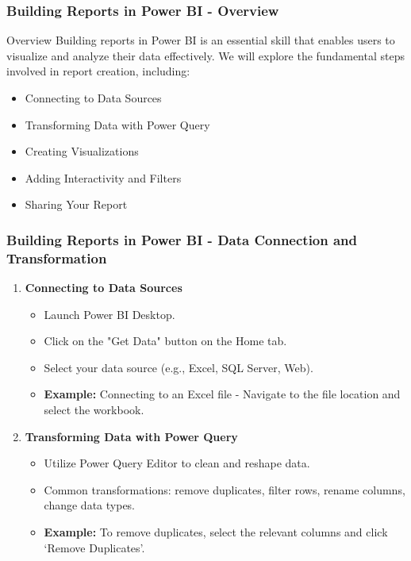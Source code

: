 \documentclass[aspectratio=169]{beamer}
\begin{document}
\begin{frame}[fragile]
    \frametitle{Building Reports in Power BI - Overview}
    \begin{block}{Overview}
        Building reports in Power BI is an essential skill that enables users to visualize and analyze their data effectively. 
        We will explore the fundamental steps involved in report creation, including:
        \begin{itemize}
            \item Connecting to Data Sources
            \item Transforming Data with Power Query
            \item Creating Visualizations
            \item Adding Interactivity and Filters
            \item Sharing Your Report
        \end{itemize}
    \end{block}
\end{frame}

\begin{frame}[fragile]
    \frametitle{Building Reports in Power BI - Data Connection and Transformation}
    \begin{enumerate}
        \item \textbf{Connecting to Data Sources}
            \begin{itemize}
                \item Launch Power BI Desktop.
                \item Click on the "Get Data" button on the Home tab.
                \item Select your data source (e.g., Excel, SQL Server, Web).
                \item \textbf{Example:} Connecting to an Excel file - Navigate to the file location and select the workbook.
            \end{itemize}
        \item \textbf{Transforming Data with Power Query}
            \begin{itemize}
                \item Utilize Power Query Editor to clean and reshape data.
                \item Common transformations: remove duplicates, filter rows, rename columns, change data types.
                \item \textbf{Example:} To remove duplicates, select the relevant columns and click ‘Remove Duplicates’.
            \end{itemize}
    \end{enumerate}
\end{frame}
\end{document}
